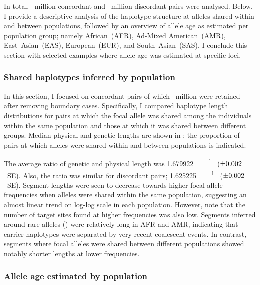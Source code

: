 In total, ~million concordant and ~million discordant pairs were analysed.
Below, I provide a descriptive analysis of the haplotype structure at alleles shared within and between populations, followed by an overview of allele age as estimated per population group; namely African~(AFR), Ad-Mixed American~(AMR), East~Asian~(EAS), European~(EUR), and South~Asian~(SAS).
I conclude this section with selected examples where allele age was estimated at specific loci.


%
\subsubsection{Shared haplotypes inferred by population}
%

In this section, I focused on concordant pairs of which ~million were retained after removing boundary cases.
Specifically, I compared haplotype length distributions for pairs at which the focal allele was shared among the individuals within the same population and those at which it was shared between different groups.
Median physical and genetic lengths are shown in ; the proportion of pairs at which alleles were shared within and between populations is indicated.

%

%

The average ratio of genetic and physical length was
\SI{1.679922}{\centi\morgan\per\mega\basepair} ($\pm\dec{0.002085}$~SE).
Also, the ratio was similar for discordant pairs;
\SI{1.625225}{\centi\morgan\per\mega\basepair} ($\pm\dec{0.002149}$~SE).
Segment lengths were seen to decrease towards higher focal allele frequencies when alleles were shared within the same population, suggesting an almost linear trend on log-log scale in each population.
However, note that the number of target sites found at higher frequencies was also low.
Segments inferred around rare alleles (\eg {}) were relatively long in AFR and AMR, indicating that carrier haplotypes were separated by very recent coalescent events.
In contrast, segments where focal alleles were shared between different populations showed notably shorter lengths at lower frequencies.




%
\subsubsection{Allele age estimated by population}
%

